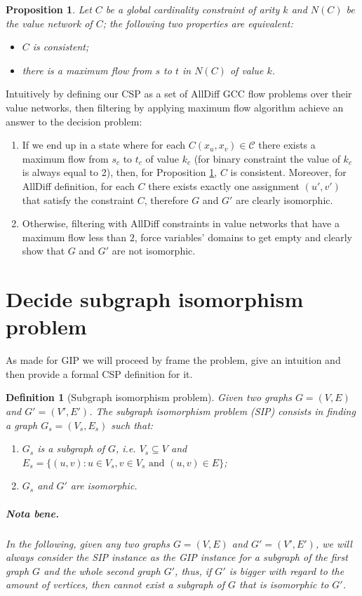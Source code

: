 \documentclass[a4paper,12pt]{article}
\theoremstyle{newplanestyle}
\newtheorem{newprop}[newtheo]{Proposition}
\theoremstyle{newdefinitionstyle}
\newtheorem{newdef}[newtheo]{Definition}
\theoremstyle{newprovestyle}
\begin{document}
\begin{newprop}\label{reg-prop}
Let $C$ be a global cardinality constraint of arity $k$ and $N(C)$ be the value network of $C$; the following two properties are equivalent:
\begin{itemize}
	\itemsep0em
	\item $C$ is consistent;
	\item there is a maximum flow from $s$ to $t$ in $N(C)$ of value $k$.
\end{itemize}
\end{newprop}

Intuitively by defining our CSP as a set of AllDiff GCC flow problems over their value networks, then filtering by applying maximum flow algorithm achieve an answer to the decision problem: 
\begin{enumerate}
	\item If we end up in a state where for each $C(x_u, x_v) \in \mathcal{C}$ there exists a maximum flow from $s_c$ to $t_c$ of value $k_c$ (for binary constraint the value of $k_c$ is always equal to 2), then, for Proposition \ref{reg-prop}, $C$ is consistent. Moreover, for AllDiff definition, for each $C$ there exists exactly one assignment $(u',v')$ that satisfy the constraint $C$, therefore $G$ and $G'$ are clearly isomorphic.
	\item Otherwise, filtering with AllDiff constraints in value networks that have a maximum flow less than $2$, force variables' domains to get empty and clearly show that $G$ and $G'$ are not isomorphic.
\end{enumerate}
\cleardoublepage

\section{Decide subgraph isomorphism problem}\label{sec-sip}
As made for GIP we will proceed by frame the problem, give an intuition and then provide a formal CSP definition for it. 

\begin{newdef}[Subgraph isomorphism problem]
	Given two graphs $G=(V,E)$ and $G'=(V',E')$. The \textit{subgraph isomorphism problem} (SIP) consists in finding a graph $G_s = (V_s, E_s)$ such that:
	\begin{enumerate}[noitemsep]
		\item $G_s$ is a subgraph of $G$, i.e. $V_s \subseteq V$ and $E_s = \{(u,v) : u \in V_s, v \in V_s \text{ and } (u,v) \in E \}$;
		\item $G_s$ and $G'$ are isomorphic.
	\end{enumerate}

\subparagraph{Nota bene.}In the following, given any two graphs $G=(V,E)$ and $G'=(V',E')$, we will always consider the SIP instance as the GIP instance for a subgraph of the first graph $G$ and the whole second graph $G'$, thus, if $G'$ is bigger with regard to the amount of vertices, then cannot exist a subgraph of $G$ that is isomorphic to $G'$.

\end{newdef}\label{def-sip}
\end{document}
